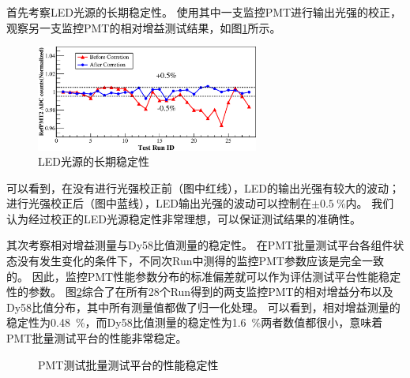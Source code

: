 首先考察LED光源的长期稳定性。
使用其中一支监控PMT进行输出光强的校正，观察另一支监控PMT的相对增益测试结果，如图\ref{fig:pmt_test:led_stability}所示。
\begin{figure}[htbp]
	\centering
	\includegraphics[width=0.65\textwidth]{chap/pmt_test/fig/led_stability.eps}
	\caption{LED光源的长期稳定性}
	\label{fig:pmt_test:led_stability}
\end{figure}
可以看到，在没有进行光强校正前（图中红线），LED的输出光强有较大的波动；进行光强校正后（图中蓝线），LED输出光强的波动可以控制在$\pm\SI{0.5}{\percent}$内。
我们认为经过校正的LED光源稳定性非常理想，可以保证测试结果的准确性。

其次考察相对增益测量与Dy58比值测量的稳定性。
在PMT批量测试平台各组件状态没有发生变化的条件下，不同次Run中测得的监控PMT参数应该是完全一致的。
因此，监控PMT性能参数分布的标准偏差就可以作为评估测试平台性能稳定性的参数。
图\ref{fig:pmt_test:ref_stability}综合了在所有28个Run得到的两支监控PMT的相对增益分布以及Dy58比值分布，其中所有测量值都做了归一化处理。
可以看到，相对增益测量的稳定性为\SI{0.48}{\percent}，而Dy58比值测量的稳定性为\SI{1.6}{\percent}两者数值都很小，意味着PMT批量测试平台的性能非常稳定。
\begin{figure}[htbp]
	\centering
	\caption{PMT测试批量测试平台的性能稳定性}
	\label{fig:pmt_test:ref_stability}
\end{figure}
